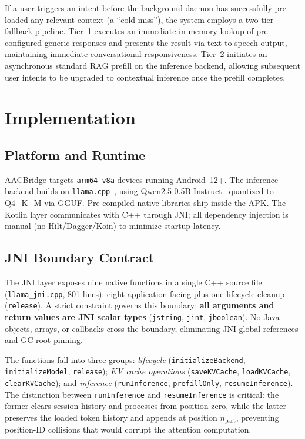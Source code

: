 \documentclass[journal]{IEEEtran}
\begin{document}
If a user triggers an intent before the background daemon has successfully pre-loaded any relevant context (a ``cold miss''), the system employs a two-tier fallback pipeline. Tier~1 executes an immediate in-memory lookup of pre-configured generic responses and presents the result via text-to-speech output, maintaining immediate conversational responsiveness. Tier~2 initiates an asynchronous standard RAG prefill on the inference backend, allowing subsequent user intents to be upgraded to contextual inference once the prefill completes.

\section{Implementation}
\label{sec:implementation}

\subsection{Platform and Runtime}
\label{sec:platform}

AACBridge targets \texttt{arm64-v8a} devices running Android~12+. The inference backend builds on \texttt{llama.cpp}~\cite{llamacpp}, using Qwen2.5-0.5B-Instruct~\cite{qwen25} quantized to Q4\_K\_M via GGUF. Pre-compiled native libraries ship inside the APK. The Kotlin layer communicates with C++ through JNI; all dependency injection is manual (no Hilt/Dagger/Koin) to minimize startup latency.

\subsection{JNI Boundary Contract}
\label{sec:jni}

The JNI layer exposes nine native functions in a single C++ source file (\texttt{llama\_jni.cpp}, 801 lines): eight application-facing plus one lifecycle cleanup (\texttt{release}). A strict constraint governs this boundary: \textbf{all arguments and return values are JNI scalar types} (\texttt{jstring}, \texttt{jint}, \texttt{jboolean}). No Java objects, arrays, or callbacks cross the boundary, eliminating JNI global references and GC root pinning.

The functions fall into three groups: \emph{lifecycle} (\texttt{initializeBackend}, \texttt{initializeModel}, \texttt{release}); \emph{KV cache operations} (\texttt{saveKVCache}, \texttt{loadKVCache}, \texttt{clearKVCache}); and \emph{inference} (\texttt{runInference}, \texttt{prefillOnly}, \texttt{resumeInference}). The distinction between \texttt{runInference} and \texttt{resumeInference} is critical: the former clears session history and processes from position zero, while the latter preserves the loaded token history and appends at position $n_{\text{past}}$, preventing position-ID collisions that would corrupt the attention computation.
\end{document}
